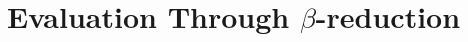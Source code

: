 \documentclass[runningheads,12pt]{llncs}
\begin{document}



\section{Evaluation Through $\beta$-reduction}

\end{document}
